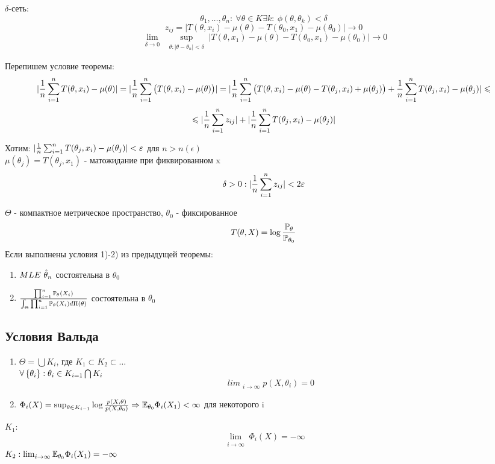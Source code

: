 \begin{definition}
	$\delta$-сеть: $$ \theta_1, \ldots, \theta_n: \ \forall \theta \in K \exists k: \ \phi(\theta, \theta_k) < \delta $$
	$$ z_{ij} = |T(\theta, x_i) - \mu(\theta) - T(\theta_0, x_1) - \mu(\theta_0)| \to 0 $$
	$$ \lim_{\substack{\delta \to 0}} \sup_{\substack{\theta: |\theta-\theta_n|< \delta}} |T(\theta, x_1) - \mu(\theta) - T(\theta_0, x_1) - \mu(\theta_0)| \to 0$$
\end{definition}

Перепишем условие теоремы:
$$ |\frac{1}{n} \sum_{\substack{i=1}}^n T(\theta, x_i) - \mu(\theta)| = |\frac{1}{n} \sum_{\substack{i=1}}^n \big( T(\theta, x_i) - \mu(\theta)\big)| = |\frac{1}{n} \sum_{\substack{i=1}}^n \big( T(\theta, x_i) - \mu(\theta) - T(\theta_j, x_i) + \mu(\theta_j)\big) + \frac{1}{n} \sum_{\substack{i=1}}^n T(\theta_j, x_i) - \mu(\theta_j)| \leqslant$$
$$ \leqslant |\frac{1}{n} \sum_{\substack{i=1}}^n z_{ij}| + |\frac{1}{n} \sum_{\substack{i=1}}^n T(\theta_j, x_i) - \mu(\theta_j)| $$

Хотим: $|\frac{1}{n} \sum_{\substack{i=1}}^n T(\theta_j, x_i) - \mu(\theta_j)| < \varepsilon$ для $n>n(\epsilon)$ \\
$\mu(\theta_j) = T(\theta_j, x_1)$ - матожидание при фиквированном x
$$ \delta > 0: |\frac{1}{n} \sum_{\substack{i=1}}^n z_{ij}| < 2\varepsilon $$

\begin{theorem}
	$\Theta$ - компактное метрическое пространство, $\theta_0$ - фиксированное
	$$ T(\theta, X) = \log \frac{\mathbb{P}_{\theta}}{\mathbb{P}_{\theta_0}} $$
	Если выполнены условия 1)-2) из предыдущей теоремы:
	\begin{enumerate}
		\item $MLE \ \hat{\theta}_n$ состоятельна в $\theta_0$
		\item $\frac{\prod_{i=1}^n \mathbb{P}_{\theta}(X_i)}{\int_{\Theta} \prod_{i=1}^n \mathbb{P}_{\theta}(X_i)d\Pi(\theta)}$ состоятельна в $\theta_0$
	\end{enumerate}
\end{theorem}

\subsection*{Условия Вальда}
\begin{enumerate}
	\item $\Theta = \bigcup K_i$, где $K_1 \subset K_2 \subset \ldots$ \\
	$\forall \left\{ \theta_i \right\}: \theta_i \in K_{i=1} \bigcap K_i$
	$$ lim_{\substack{i \to \infty}} p(X, \theta_i) = 0 $$

	\item $\Phi_i(X) = \sup_{\substack{\theta \in K_{i-1}}} \log \frac{p(X, \theta)}{p(X, \theta_0)} \Rightarrow \mathbb{E}_{\theta_0} \Phi_i(X_1) < \infty$ для некоторого i
\end{enumerate}
$K_1:$ $$ \lim_{\substack{i \to \infty}} \Phi_i(X) = -\infty $$
$K_2: \lim_{\substack{i \to \infty}} \mathbb{E}_{\theta_0} \Phi_i(X_1) = - \infty$

